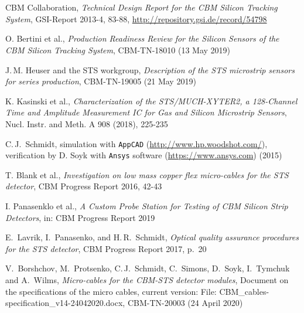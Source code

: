 
\clearpage


\section*{}

\begin{thebibliography}{99}

 CBM Collaboration, {\em Technical Design Report for the CBM Silicon Tracking System}, GSI-Report 2013-4, 83-88, \url{http://repository.gsi.de/record/54798} 
		
 O. Bertini et al., {\em Production Readiness Review for the Silicon Sensors of the CBM Silicon Tracking System}, CBM-TN-18010 (13 May 2019)

 J.\,M. Heuser and the STS workgroup, {\em Description of the STS microstrip sensors for series production}, CBM-TN-19005 (21 May 2019)

 K. Kasinski et al., {\em Characterization of the STS/MUCH-XYTER2, a 128-Channel Time and Amplitude Measurement IC for Gas and Silicon Microstrip Sensors}, Nucl. Instr. and Meth. A 908 (2018), 225-235 

 C.\,J.~Schmidt, simulation with {\tt AppCAD} (\url{http://www.hp.woodshot.com/}), verification by D. Soyk with {\tt Ansys} software (\url{https://www.ansys.com}) (2015)

 T. Blank et al., {\em Investigation on low mass copper flex micro-cables for the STS detector}, CBM Progress Report 2016, 42-43

I. Panasenklo et al., {\em A Custom Probe Station for Testing of CBM Silicon Strip Detectors}, in: CBM Progress Report 2019 

E.~Lavrik, I.~Panasenko, and H.\,R.~Schmidt, {\em Optical quality assurance procedures for the STS detector}, CBM Progress Report 2017, p.~20

 V.~Borshchov, M.~Protsenko, C.\,J.~Schmidt, C.~Simons, D.~Soyk, I.~Tymchuk and A.~Wilms, {\em  \mbox{Micro-cables} for the CBM-STS detector modules}, Document on the specifications of the micro cables, current version: 	    
File: CBM\_cables-specification\_v14-24042020.docx, CBM-TN-20003 (24 April 2020)


\end{thebibliography}
